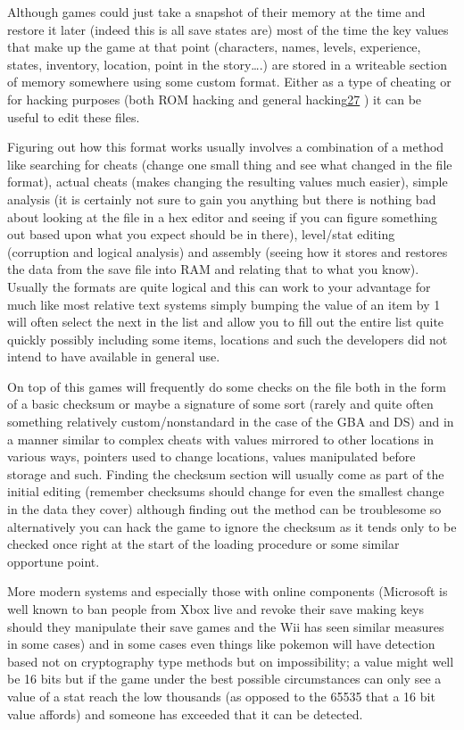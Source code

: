 \documentclass[
]{book}
\begin{document}
Although games could just take a snapshot of their memory at the time and restore it later (indeed this is all save states are) most of the time the key values that make up the game at that point (characters, names, levels, experience, states, inventory, location, point in the story\ldots.) are stored in a writeable section of memory somewhere using some custom format. Either as a type of cheating or for hacking purposes (both ROM hacking and general hacking\href{romhacking202028.html\#fn27x0}{27} ) it can be useful to edit these files.

Figuring out how this format works usually involves a combination of a method like searching for cheats (change one small thing and see what changed in the file format), actual cheats (makes changing the resulting values much easier), simple analysis (it is certainly not sure to gain you anything but there is nothing bad about looking at the file in a hex editor and seeing if you can figure something out based upon what you expect should be in there), level/stat editing (corruption and logical analysis) and assembly (seeing how it stores and restores the data from the save file into RAM and relating that to what you know). Usually the formats are quite logical and this can work to your advantage for much like most relative text systems simply bumping the value of an item by 1 will often select the next in the list and allow you to fill out the entire list quite quickly possibly including some items, locations and such the developers did not intend to have available in general use.

On top of this games will frequently do some checks on the file both in the form of a basic checksum or maybe a signature of some sort (rarely and quite often something relatively custom/nonstandard in the case of the GBA and DS) and in a manner similar to complex cheats with values mirrored to other locations in various ways, pointers used to change locations, values manipulated before storage and such. Finding the checksum section will usually come as part of the initial editing (remember checksums should change for even the smallest change in the data they cover) although finding out the method can be troublesome so alternatively you can hack the game to ignore the checksum as it tends only to be checked once right at the start of the loading procedure or some similar opportune point.

More modern systems and especially those with online components (Microsoft is well known to ban people from Xbox live and revoke their save making keys should they manipulate their save games and the Wii has seen similar measures in some cases) and in some cases even things like pokemon will have detection based not on cryptography type methods but on impossibility; a value might well be 16 bits but if the game under the best possible circumstances can only see a value of a stat reach the low thousands (as opposed to the 65535 that a 16 bit value affords) and someone has exceeded that it can be detected.
\end{document}
